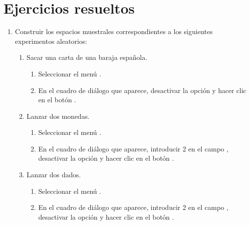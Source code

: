 \section{Ejercicios resueltos}
\begin{enumerate}[leftmargin=*] 
\item Construir los espacios muestrales correspondientes a los siguientes experimentos aleatorios:
\begin{enumerate}
\item Sacar una carta de una baraja española.
\begin{indicacion}
\begin{enumerate}
\item Seleccionar el menú .
\item En el cuadro de diálogo que aparece, desactivar la opción  y hacer clic en el botón . 
\end{enumerate}
\end{indicacion}
\item Lanzar dos monedas.
\begin{indicacion}
\begin{enumerate}
\item Seleccionar el menú .
\item En el cuadro de diálogo que aparece, introducir 2 en el campo , desactivar la opción  y hacer clic en el botón .
\end{enumerate}
\end{indicacion}

\item Lanzar dos dados.
\begin{indicacion}
\begin{enumerate}
\item Seleccionar el menú .
\item En el cuadro de diálogo que aparece, introducir 2 en el campo , desactivar la opción  y hacer clic en el botón .
\end{enumerate}
\end{indicacion}


\end{enumerate}
\end{enumerate}
